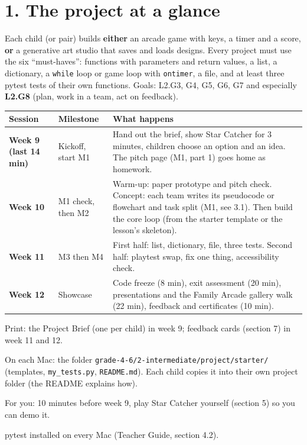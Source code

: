\documentclass[level=2,teacher]{kidscode}
\begin{document}

\setcounter{tocdepth}{1}
\tableofcontents

\section{1. The project at a glance}
Each child (or pair) builds \textbf{either} an arcade game with keys, a timer and a score,
\textbf{or} a generative art studio that saves and loads designs. Every project must use the six
\enquote{must-haves}: functions with parameters and return values, a list, a dictionary, a
\texttt{while} loop or game loop with \texttt{ontimer}, a file, and at least three pytest tests of
their own functions. Goals: L2.G3, G4, G5, G6, G7 and especially \textbf{L2.G8} (plan, work in a team,
act on feedback).

{\small
\renewcommand{\arraystretch}{1.3}
\begin{longtable}{@{}>{\bfseries}p{1.6cm}>{\raggedright\arraybackslash}p{4.4cm}>{\raggedright\arraybackslash}p{8.6cm}@{}}
\toprule
Session & Milestone & What happens \\ \midrule\endhead
Week 9 (last 14 min) & Kickoff, start M1 & Hand out the brief, show Star Catcher for 3 minutes, children choose an option and an idea. The pitch page (M1, part 1) goes home as homework. \\
Week 10 & M1 check, then M2 & Warm-up: paper prototype and pitch check. Concept: each team writes its pseudocode or flowchart and task split (M1, see 3.1). Then build the core loop (from the starter template or the lesson's skeleton). \\
Week 11 & M3 then M4 & First half: list, dictionary, file, three tests. Second half: playtest swap, fix one thing, accessibility check. \\
Week 12 & Showcase & Code freeze (8 min), exit assessment (20 min), presentations and the Family Arcade gallery walk (22 min), feedback and certificates (10 min). \\
\bottomrule
\end{longtable}}

\begin{materials}
  \item Print: the Project Brief (one per child) in week 9; feedback cards (section 7) in week 11 and 12.
  \item On each Mac: the folder \texttt{grade-4-6/2-intermediate/project/starter/} (templates, \texttt{my\_tests.py},
        \texttt{README.md}). Each child copies it into their own project folder (the README explains how).
  \item For you: 10 minutes before week 9, play Star Catcher yourself (section 5) so you can demo it.
  \item pytest installed on every Mac (Teacher Guide, section 4.2).
\end{materials}
\end{document}
